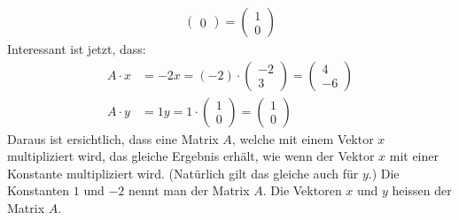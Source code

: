\begin{beispiel}
\begin{align*}
\begin{pmatrix}
                   0
                 \end{pmatrix}
               = \begin{pmatrix}
                   1\\
                   0
                 \end{pmatrix}
  \end{align*}
  Interessant ist jetzt, dass:
  \begin{align*}
    A \cdot x &= -2x = (-2)\cdot\begin{pmatrix}
                                  -2\\
                                  3
                                \end{pmatrix}
                              = \begin{pmatrix}
                                  4\\
                                  -6
                                \end{pmatrix}\\
    A \cdot y &= 1y = 1\cdot\begin{pmatrix}
                              1\\
                              0
                            \end{pmatrix}
                          = \begin{pmatrix}
                              1\\
                              0
                            \end{pmatrix}
  \end{align*}
  Daraus ist ersichtlich, dass eine Matrix $A$, welche mit einem
  Vektor $x$ multipliziert wird, das gleiche Ergebnis erhält, wie wenn
  der Vektor $x$ mit einer Konstante multipliziert wird.  (Natürlich
  gilt das gleiche auch für $y$.)  Die Konstanten $1$ und $-2$ nennt
  man  der Matrix $A$.  Die Vektoren $x$ und $y$
  heissen  der Matrix $A$.
\end{beispiel}